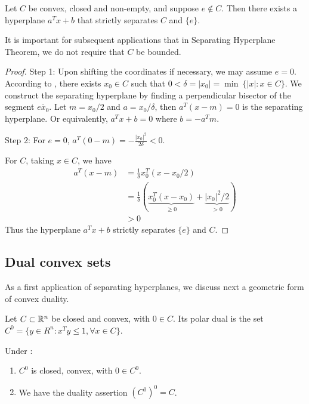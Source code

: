 \begin{theorem}
Let $C$ be convex, closed and non-empty, and suppose $e \notin C$.
Then there exists a hyperplane $a^T x + b$ that strictly separates $C$ and $\{ e \}$.
\end{theorem}

\begin{remark}
It is important for subsequent applications that in Separating Hyperplane Theorem, we do not require that $C$ be bounded.
\end{remark}

\begin{proof}
Step 1:
Upon shifting the coordinates if necessary, we may assume $e = 0$.
According to , there exists $x_0 \in C$ such that $0 < \delta = |x_0| = \min \ \{ |x| : x \in C \}$.
We construct the separating hyperplane by finding a perpendicular bisector of the segment $\overline{e x_0}$.
Let $m = x_0 / 2$ and $a = x_0 / \delta$, then $a^T (x - m) = 0$ is the separating hyperplane.
Or equivalently, $a^T x + b = 0$ where $b = -a^T m$.

Step 2:
For $e=0$, $a^T (0 - m) = -\frac{|x_0|^2}{2 \delta} < 0$.

For $C$, taking $x \in C$, we have
\begin{align}
a^T (x-m) 
& = \frac{1}{\delta} x_0^T (x- x_0/2) \\
& = \frac{1}{\delta} \left( \underbrace{x_0^T (x- x_0)}_{\ge 0} + \underbrace{|x_0|^2/2}_{>0} \right) \\
& > 0
\end{align}
Thus the hyperplane $a^T x + b$ strictly separates $\{ e \}$ and $C$.
\end{proof}

\subsection{Dual convex sets}

As a first application of separating hyperplanes, we discuss next a geometric form of convex duality.

\begin{definition}
Let $C \subset \mathbb{R}^n$ be closed and convex, with $0 \in C$.
Its polar dual is the set $C^0 = \{ y \in R^n: x^T y \le 1, \forall x \in C \}$.
\end{definition}

\begin{theorem}
Under :
\begin{enumerate}
    \item $C^0$ is closed, convex, with $0 \in C^0$.
    \item We have the duality assertion $(C^0)^0 = C$.
\end{enumerate}
\end{theorem}

